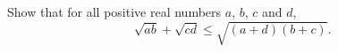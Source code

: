 Show that for all positive real numbers $a$, $b$, $c$ and $d$,
\[
\sqrt{ab} + \sqrt{cd} \leq \sqrt{(a+d)(b+c)}.
\]
